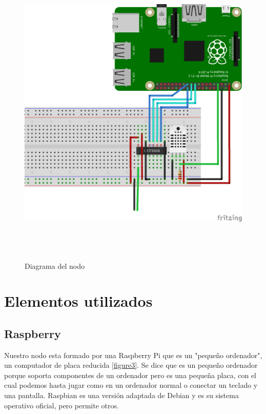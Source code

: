 \begin{figure}[htb]
	
	\begin{center}
		\includegraphics[width=15cm,height=15cm]{figures/solar_project_node_diagram.png}
		\caption{Diagrama del nodo}
	\end{center}
	
	\label{figure2}
\end{figure}

\section{Elementos utilizados}
\label{makereference4.2}
\subsection{Raspberry}

Nuestro nodo esta formado por una Raspberry Pi que es un "pequeño ordenador", un computador de placa reducida   \ref{figure3}. Se dice que es un pequeño ordenador porque soporta componentes de un ordenador pero es una pequeña placa, con el cual podemos hasta jugar como en un ordenador normal o conectar un teclado y una pantalla.
 Raspbian es una versión adaptada de Debian y es su sistema operativo oficial, pero permite otros.
 
